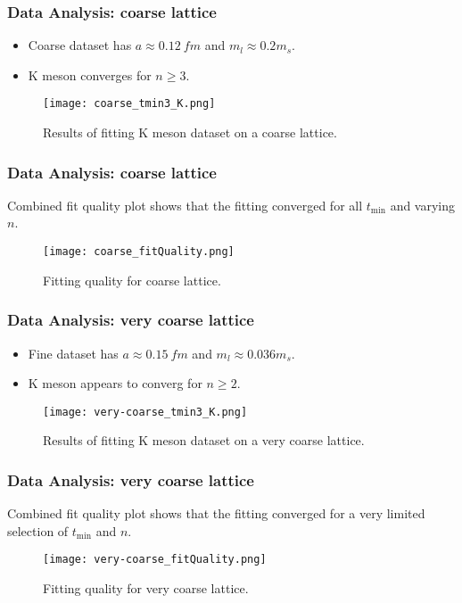\documentclass{beamer}
\begin{document}
\begin{frame}
    \frametitle{Data Analysis: coarse lattice}
    \begin{itemize}
        \item Coarse dataset has $a \approx \SI{0.12}{fm}$ and $m_l \approx 0.2 m_s$.
        \item K meson converges for $n \geq 3$.
    \end{itemize}
    \begin{figure}
        \centering
        \texttt{[image: coarse\_tmin3\_K.png]}
        \caption{Results of fitting K meson dataset on a coarse lattice.}
    \end{figure}
\end{frame}

\begin{frame}
    \frametitle{Data Analysis: coarse lattice}
    Combined fit quality plot shows that the fitting converged for all $t_\mathrm{min}$ and varying $n$.
    \begin{figure}
        \centering
        \texttt{[image: coarse\_fitQuality.png]}
        \caption{Fitting quality for coarse lattice.}
    \end{figure}
\end{frame}

\begin{frame}
    \frametitle{Data Analysis: very coarse lattice}
    \begin{itemize}
        \item Fine dataset has $a \approx \SI{0.15}{fm}$ and $m_l \approx 0.036 m_s$.
        \item K meson appears to converg for $n \geq 2$.
    \end{itemize}
    \begin{figure}
        \centering
        \texttt{[image: very-coarse\_tmin3\_K.png]}
        \caption{Results of fitting K meson dataset on a very coarse lattice.}
    \end{figure}
\end{frame}

\begin{frame}
    \frametitle{Data Analysis: very coarse lattice}
    Combined fit quality plot shows that the fitting converged for a very limited selection of $t_\mathrm{min}$ and $n$.
    \begin{figure}
        \centering
        \texttt{[image: very-coarse\_fitQuality.png]}
        \caption{Fitting quality for very coarse lattice.}
    \end{figure}
\end{frame}
\end{document}
